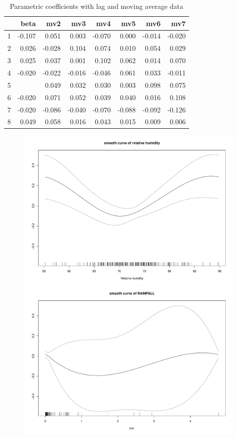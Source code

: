 \documentclass[a4paper, 12pt]{article}
\begin{document}
\begin{table}[h]
\centering
\caption{Parametric coefficients with lag and moving average data}
\begin{tabular}{rrrrrrrr}
  \hline
 & beta & mv2 & mv3 & mv4 & mv5 & mv6 & mv7 \\
  \hline
1 & -0.107 & 0.051 & 0.003 & -0.070 & 0.000 & -0.014 & -0.020 \\
  2 & 0.026 & -0.028 & 0.104 & 0.074 & 0.010 & 0.054 & 0.029 \\
  3 & 0.025 & 0.037 & 0.001 & 0.102 & 0.062 & 0.014 & 0.070 \\
  4 & -0.020 & -0.022 & -0.016 & -0.046 & 0.061 & 0.033 & -0.011 \\
  5 & \color{red}{0.096} & 0.049 & 0.032 & 0.030 & 0.003 & 0.098 & 0.075 \\
  6 & -0.020 & 0.071 & 0.052 & 0.039 & 0.040 & 0.016 & 0.108 \\
  7 & -0.020 & -0.086 & -0.040 & -0.070 & -0.088 & -0.092 & -0.126 \\
  8 & 0.049 & 0.058 & 0.016 & 0.043 & 0.015 & 0.009 & 0.006 \\
   \hline
\end{tabular}
\end{table}
\begin{figure}[ht!]
       \includegraphics[width=13cm]{RH_SO2.pdf}
       \includegraphics[width=13cm]{RAIN_SO2.pdf}
\end{figure}
\end{document}
